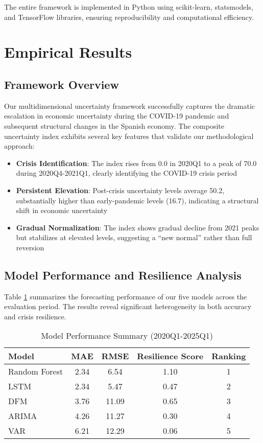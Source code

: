 \documentclass[5p,authoryear]{elsarticle}
\begin{document}
The entire framework is implemented in Python using scikit-learn, statsmodels, and TensorFlow libraries, ensuring reproducibility and computational efficiency.

\section{Empirical Results}

\subsection{Framework Overview}

Our multidimensional uncertainty framework successfully captures the dramatic escalation in economic uncertainty during the COVID-19 pandemic and subsequent structural changes in the Spanish economy. The composite uncertainty index exhibits several key features that validate our methodological approach:

\begin{itemize}
    \item \textbf{Crisis Identification}: The index rises from 0.0 in 2020Q1 to a peak of 70.0 during 2020Q4-2021Q1, clearly identifying the COVID-19 crisis period
    \item \textbf{Persistent Elevation}: Post-crisis uncertainty levels average 50.2, substantially higher than early-pandemic levels (16.7), indicating a structural shift in economic uncertainty
    \item \textbf{Gradual Normalization}: The index shows gradual decline from 2021 peaks but stabilizes at elevated levels, suggesting a ``new normal'' rather than full reversion
\end{itemize}

\subsection{Model Performance and Resilience Analysis}

Table \ref{tab:model_performance} summarizes the forecasting performance of our five models across the evaluation period. The results reveal significant heterogeneity in both accuracy and crisis resilience.

\begin{table}[h]
\centering
\caption{Model Performance Summary (2020Q1-2025Q1)}
\label{tab:model_performance}
\begin{tabular}{lcccc}
\toprule
Model & MAE & RMSE & Resilience Score & Ranking \\
\midrule
Random Forest & 2.34 & 6.54 & 1.10 & 1 \\
LSTM & 2.34 & 5.47 & 0.47 & 2 \\
DFM & 3.76 & 11.09 & 0.65 & 3 \\
ARIMA & 4.26 & 11.27 & 0.30 & 4 \\
VAR & 6.21 & 12.29 & 0.06 & 5 \\
\bottomrule
\end{tabular}
\end{table}
\end{document}
